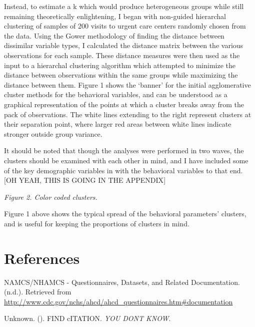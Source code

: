 \documentclass[12pt,twoside]{reedthesis}
\begin{document}
  Instead, to estimate a k which would produce heterogeneous groups while
  still remaining theoretically enlightening, I began with non-guided
  hierarchal clustering of samples of 200 visits to urgent care centers
  randomly chosen from the data. Using the Gower methodology of finding
  the distance between dissimilar variable types, I calculated the
  distance matrix between the various observations for each sample. These
  distance measures were then used as the input to a hierarchal clustering
  algorithm which attempted to minimize the distance between observations
  within the same groups while maximizing the distance between them.
  Figure 1 shows the `banner' for the initial agglomerative cluster
  methods for the behavioral variables, and can be understood as a
  graphical representation of the points at which a cluster breaks away
  from the pack of observations. The white lines extending to the right
  represent clusters at their separation point, where larger red areas
  between white lines indicate stronger outside group variance.
  
  It should be noted that though the analyses were performed in two waves,
  the clusters should be examined with each other in mind, and I have
  included some of the key demographic variables in with the behavioral
  variables to that end. {[}OH YEAH, THIS IS GOING IN THE APPENDIX{]}
  
  \emph{Figure 2. Color coded clusters.}
  
  Figure 1 above shows the typical spread of the behavioral parameters'
  clusters, and is useful for keeping the proportions of clusters in mind.
  
  \backmatter
  
  \chapter{References}\label{references}
  
  \noindent
  
  \setlength{\parindent}{-0.20in} \setlength{\leftskip}{0.20in}
  \setlength{\parskip}{8pt}
  
  \hypertarget{refs}{}
  \hypertarget{ref-namcs}{}
  NAMCS/NHAMCS - Questionnaires, Datasets, and Related Documentation.
  (n.d.). Retrieved from
  \url{http://www.cdc.gov/nchs/ahcd/ahcd_questionnaires.htm\#documentation}
  
  \hypertarget{ref-CITE}{}
  Unknown. (). FIND cITATION. \emph{YOU DONT KNOW}.


\end{document}
